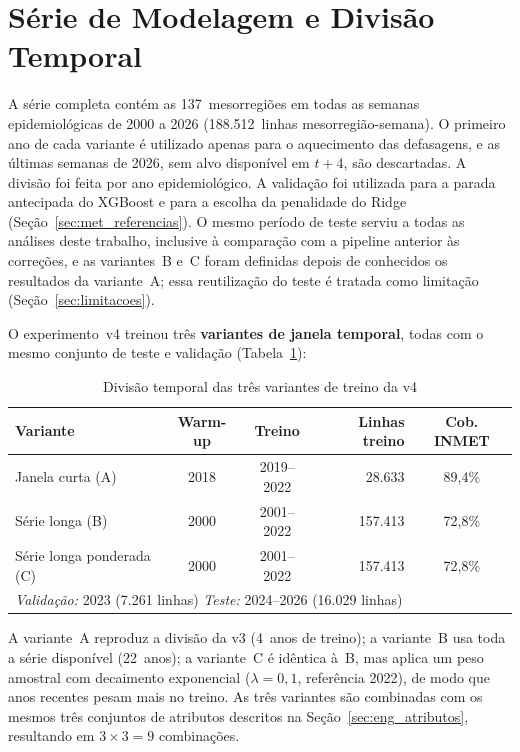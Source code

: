 \section{Série de Modelagem e Divisão Temporal}

A série completa contém as 137~mesorregiões em todas as semanas epidemiológicas de 2000 a 2026 (188.512~linhas mesorregião-semana). O primeiro ano de cada variante é utilizado apenas para o aquecimento das defasagens, e as últimas semanas de 2026, sem alvo disponível em $t+4$, são descartadas. A divisão foi feita por ano epidemiológico. A validação foi utilizada para a parada antecipada do XGBoost e para a escolha da penalidade do Ridge (Seção~\ref{sec:met_referencias}). O mesmo período de teste serviu a todas as análises deste trabalho, inclusive à comparação com a pipeline anterior às correções, e as variantes~B e~C foram definidas depois de conhecidos os resultados da variante~A; essa reutilização do teste é tratada como limitação (Seção~\ref{sec:limitacoes}).

O experimento~v4 treinou três \textbf{variantes de janela temporal}, todas com o mesmo conjunto de teste e validação (Tabela~\ref{tab:divisao_temporal_v4}):

\begin{table}[htb]
\centering
\caption{Divisão temporal das três variantes de treino da v4}
\label{tab:divisao_temporal_v4}
\begin{tabular}{|l|c|c|r|c|}
\hline
\textbf{Variante} & \textbf{Warm-up} & \textbf{Treino} & \textbf{Linhas treino} & \textbf{Cob. INMET} \\ \hline
Janela curta (A) & 2018 & 2019--2022 & 28.633 & 89,4\% \\ \hline
Série longa (B) & 2000 & 2001--2022 & 157.413 & 72,8\% \\ \hline
Série longa ponderada (C) & 2000 & 2001--2022 & 157.413 & 72,8\% \\ \hline
\multicolumn{5}{|l|}{\textit{Validação:} 2023 (7.261 linhas) \quad \textit{Teste:} 2024--2026 (16.029 linhas)} \\ \hline
\end{tabular}
\end{table}

A variante~A reproduz a divisão da v3 (4~anos de treino); a variante~B usa toda a série disponível (22~anos); a variante~C é idêntica à~B, mas aplica um peso amostral com decaimento exponencial ($\lambda=0{,}1$, referência 2022), de modo que anos recentes pesam mais no treino. As três variantes são combinadas com os mesmos três conjuntos de atributos descritos na Seção~\ref{sec:eng_atributos}, resultando em $3 \times 3 = 9$ combinações.

